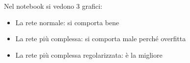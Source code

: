 Nel notebook si vedono 3 grafici:
\begin{itemize}
    \item La rete normale: si comporta bene
    \item La rete più complessa: si comporta male perché overfitta 
    \item La rete più complessa regolarizzata: è la migliore
\end{itemize}

\newpage